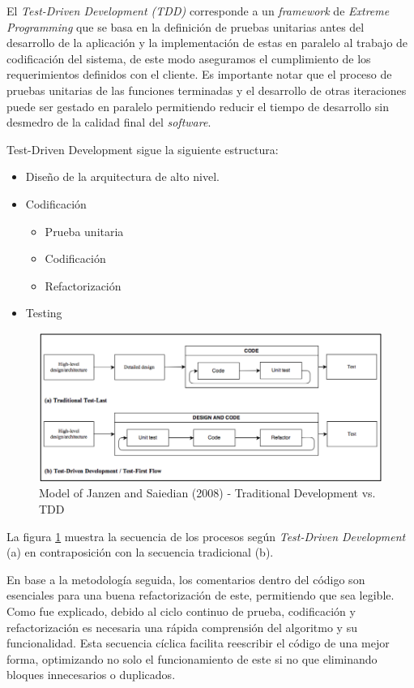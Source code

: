 El \emph{Test-Driven Development (TDD)} corresponde a un \emph{framework} de \emph{Extreme Programming} que se basa en la definición de pruebas unitarias antes del desarrollo de la aplicación y la implementación de estas en paralelo al trabajo de codificación del sistema, de este modo aseguramos el cumplimiento de los requerimientos definidos con el cliente. Es importante notar que el proceso de pruebas unitarias de las funciones terminadas y el desarrollo de otras iteraciones puede ser gestado en paralelo permitiendo reducir el tiempo de desarrollo sin desmedro de la calidad final del \emph{software}. 

Test-Driven Development sigue la siguiente estructura:
\begin{itemize}
	\item Diseño de la arquitectura de alto nivel.
	\item Codificación
		\begin{itemize}
		\item Prueba unitaria
		\item Codificación
		\item Refactorización
		\end{itemize}
	\item Testing
\end{itemize}

\begin{figure}[ht!]
\centering
\includegraphics[width=1\textwidth]{figures/mapa-tdd.png}
\caption{Model of Janzen and Saiedian (2008) - Traditional Development vs. TDD}
\label{fig:Traditional Development vs. TDD}
\end{figure}

La figura \ref{fig:Traditional Development vs. TDD} muestra la secuencia de los procesos según \emph{Test-Driven Development} (a) en contraposición con la secuencia tradicional (b).

En base a la metodología seguida, los comentarios dentro del código son esenciales para una buena refactorización de este, permitiendo que sea legible. Como fue explicado, debido al ciclo continuo de prueba, codificación y refactorización es necesaria una rápida comprensión del algoritmo y su funcionalidad. Esta secuencia cíclica facilita reescribir el código de una mejor forma, optimizando no solo el funcionamiento de este si no que eliminando bloques innecesarios o duplicados.

